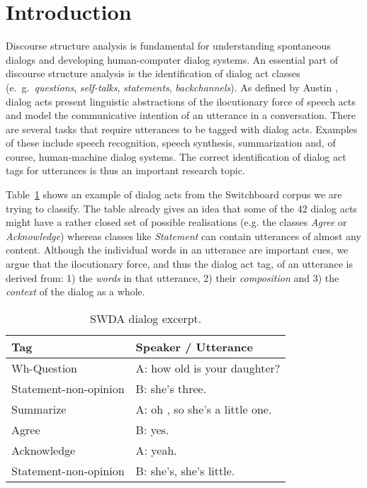 \section{Introduction}\label{sec:intro}
Discourse structure analysis is fundamental for understanding spontaneous dialogs and developing human-computer dialog systems.
An essential part of discourse structure analysis is the identification of dialog act classes (e.\ g.\ \emph{questions}, \emph{self-talks}, \emph{statements}, \emph{backchannels}).
As defined by Austin , dialog acts present linguistic abstractions of the ilocutionary force of speech acts and model the communicative intention of an utterance in a conversation.
There are several tasks that require utterances to be tagged with dialog acts.
Examples of these include speech recognition, speech synthesis, summarization and, of course, human-machine dialog systems.
The correct identification of dialog act tags for utterances is thus an important research topic.


Table~\ref{tab:swda_example} shows an example of dialog acts from the Switchboard corpus we are trying to classify.
The table already gives an idea that some of the 42 dialog acts might have a rather closed set of possible realisations (e.g. the classes \emph{Agree} or \emph{Acknowledge}) whereas classes like \emph{Statement} can contain utterances of almost any content.
Although the individual words in an utterance are important cues, we argue that the ilocutionary force, and thus the dialog act tag, of an utterance is derived from: 1) the \emph{words} in that utterance, 2) their \emph{composition} and 3) the \emph{context} of the dialog as a whole. 



\begin{table}[h]
\centering
\small
\begin{tabular}{ll}
\hline
\textbf{Tag} & \textbf{Speaker / Utterance}
\\
\hline
Wh-Question & A: how old is your daughter?\\
Statement-non-opinion & B: she's three.\\
Summarize & A: oh , so she's a little one.\\
Agree & B: yes.\\
Acknowledge & A: yeah.\\
Statement-non-opinion & B: she's, she's little.\\
\hline
\end{tabular}
\caption{SWDA dialog excerpt.}
\label{tab:swda_example}
\end{table}

